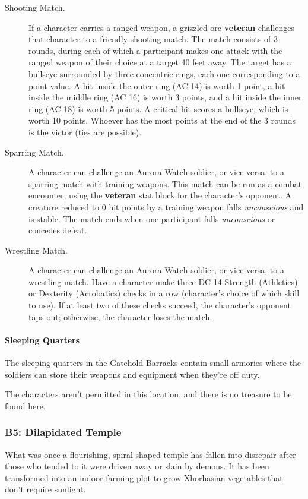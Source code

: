 \documentclass[letterpaper, 11pt, bg=full, twocolumn]{dndbook}
\begin{document}
\begin{description}
\item[Shooting Match.] If a character carries a ranged weapon, a grizzled orc \textbf{veteran} challenges that character to a friendly shooting match. The match consists of 3 rounds, during each of which a participant makes one attack with the ranged weapon of their choice at a target 40 feet away. The target has a bullseye surrounded by three concentric rings, each one corresponding to a point value. A hit inside the outer ring (AC 14) is worth 1 point, a hit inside the middle ring (AC 16) is worth 3 points, and a hit inside the inner ring (AC 18) is worth 5 points. A critical hit scores a bullseye, which is worth 10 points. Whoever has the most points at the end of the 3 rounds is the victor (ties are possible).
\item[Sparring Match.] A character can challenge an Aurora Watch soldier, or vice versa, to a sparring match with training weapons. This match can be run as a combat encounter, using the \textbf{veteran} stat block for the character's opponent. A creature reduced to 0 hit points by a training weapon falls \textit{unconscious} and is stable. The match ends when one participant falls \textit{unconscious} or concedes defeat.
\item[Wrestling Match.] A character can challenge an Aurora Watch soldier, or vice versa, to a wrestling match. Have a character make three DC 14 Strength (Athletics) or Dexterity (Acrobatics) checks in a row (character's choice of which skill to use). If at least two of these checks succeed, the character's opponent taps out; otherwise, the character loses the match.
\end{description}

\paragraph{Sleeping Quarters}

The sleeping quarters in the Gatehold Barracks contain small armories where the soldiers can store their weapons and equipment when they're off duty.

The characters aren't permitted in this location, and there is no treasure to be found here.

\subsubsection{B5: Dilapidated Temple}

What was once a flourishing, spiral-shaped temple has fallen into disrepair after those who tended to it were driven away or slain by demons. It has been transformed into an indoor farming plot to grow Xhorhasian vegetables that don't require sunlight.
\end{document}
